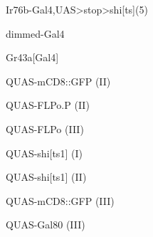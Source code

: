 \documentclass[17pt]{extarticle}
\begin{document}
\newpage\vspace*{-0.15cm}
\begin{footnotesize}
Ir76b-Gal4,UAS>stop>shi[ts](5) \\[0.5em]
\end{footnotesize}
\footnotesize
\newpage\vspace*{-0.15cm}
\begin{normalsize}
dimmed-Gal4 \\[0.5em]
\end{normalsize}
\footnotesize
\newpage\vspace*{-0.15cm}
\begin{normalsize}
Gr43a[Gal4] \\[0.5em]
\end{normalsize}
\footnotesize
\newpage\vspace*{-0.15cm}
\begin{footnotesize}
QUAS-mCD8::GFP (II) \\[0.5em]
\end{footnotesize}
\footnotesize
\newpage\vspace*{-0.15cm}
\begin{footnotesize}
QUAS-FLPo.P (II) \\[0.5em]
\end{footnotesize}
\footnotesize
\newpage\vspace*{-0.15cm}
\begin{normalsize}
QUAS-FLPo (III) \\[0.5em]
\end{normalsize}
\footnotesize
\newpage\vspace*{-0.15cm}
\begin{footnotesize}
QUAS-shi[ts1] (I) \\[0.5em]
\end{footnotesize}
\footnotesize
\newpage\vspace*{-0.15cm}
\begin{footnotesize}
QUAS-shi[ts1] (II) \\[0.5em]
\end{footnotesize}
\footnotesize
\newpage\vspace*{-0.15cm}
\begin{footnotesize}
QUAS-mCD8::GFP (III) \\[0.5em]
\end{footnotesize}
\footnotesize
\newpage\vspace*{-0.15cm}
\begin{footnotesize}
QUAS-Gal80 (III) \\[0.5em]
\end{footnotesize}
\end{document}

